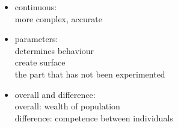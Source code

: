 \documentclass{article}
\begin{document}
\begin{itemize}
	\item continuous:\\
		more complex, accurate\\

	\item parameters:\\
		determines behaviour\\
		create surface\\
		the part that has not been experimented\\

	\item overall and difference:\\
		overall: wealth of population\\
		difference: competence between individuals\\

\end{itemize}
\end{document}
